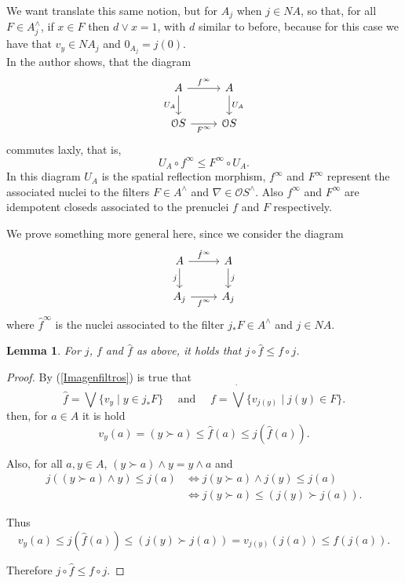 \documentclass[11pt]{amsart}
\theoremstyle{plain}
\newtheorem{lem}[thm]{Lemma}
\theoremstyle{definition}
\begin{document}
We want translate this same notion, but for $A_j$ when $j\in NA$, so that, for all 
$F\in A_j^\wedge$, if $x\in F$ then $d\vee x=1$, with $d$ similar to before, because for this case we have that $v_y\in NA_j$ and $0_{A_j}=j(0)$.\\

In \cite[Lemma 8.9 and Corollary 8.10]{simmons2004vietoris} the author shows, that the diagram
\[
\begin{tikzcd}
	A & A \\
	{\mathcal{O}S} & {\mathcal{O}S}
	\arrow["{f^\infty}", from=1-1, to=1-2]
	\arrow["{U_A}"', from=1-1, to=2-1]
	\arrow["{U_A}", from=1-2, to=2-2]
	\arrow["{F^\infty}"', from=2-1, to=2-2]
\end{tikzcd}
\]
commutes laxly, that is, \[U_A\circ f^\infty\leq F^\infty \circ U_A.\] 
In this diagram $U_A$ is the spatial reflection morphism, 
$f^\infty$ and $F^\infty$ represent the associated nuclei to the filters $F\in A^\wedge$ and $\nabla\in \mathcal{O}S^\wedge$. 
Also $f^\infty$ and $F^\infty$ are idempotent closeds associated to the prenuclei $f$ and $F$ respectively.

We prove something more general here, since we consider the diagram
\[\begin{tikzcd}
	A & A \\
	{A_j} & {A_j}
	\arrow["{\hat{f}^\infty}", from=1-1, to=1-2]
	\arrow["j"', from=1-1, to=2-1]
	\arrow["j", from=1-2, to=2-2]
	\arrow["{f^\infty}"', from=2-1, to=2-2]
\end{tikzcd}\]
where $\hat{f}^\infty$ is the nuclei associated to the filter $j_*F\in A^\wedge$ and $j\in NA$.  

\begin{lem}\label{f1f}
    For $j$, $f$ and $\hat{f}$ as above, it holds that $j\circ \hat{f}\leq f\circ j$.
\end{lem}
\begin{proof}
    By (\ref{Imagenfiltros}) is true that
    \[
    \hat{f}=\dot{\bigvee}\{v_y\mid y\in j_*F\}\quad  \mbox{ and } \quad f=\dot{\bigvee}\{v_{j(y)}\mid j(y)\in F\}. 
    \]
then, for $a\in A$ it is hold
\[
v_y(a)=(y\succ a)\leq \hat{f}(a)\leq j(\hat{f}(a)).
\]

Also, for all $a, y\in A$, $(y\succ a)\wedge y=y\wedge a$ and
\[
\begin{split}
j((y\succ a)\wedge y)\leq j(a) & \Leftrightarrow j(y\succ a)\wedge j(y)\leq j(a)\\
& \Leftrightarrow j(y\succ a)\leq (j(y)\succ j(a)).
\end{split}
\]

Thus 
\[
v_y(a)\leq j(\hat{f}(a))\leq (j(y)\succ j(a))=v_{j(y)}(j(a))\leq f(j(a)).
\]

Therefore $j\circ \hat{f}\leq f\circ j$.
\end{proof}
\end{document}
